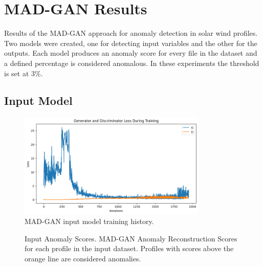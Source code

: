 \chapter{MAD-GAN Results}\label{apdx:madgan_res}
Results of the MAD-GAN approach for anomaly detection in solar wind profiles. Two models were created, one for detecting input variables and the other for the outputs. Each model produces an anomaly score for every file in the dataset and a defined percentage is considered anomalous. In these experiments the threshold is set at 3\%.

\section{Input Model}

\begin{figure}[h]
    \centering
    \includegraphics[width=0.8\textwidth]{figures/madga_train_hist_in.png}
    \caption{MAD-GAN input model training history.}
    \label{fig_a:madgan_in_hist}
\end{figure}

\begin{figure}
    \centering
    \caption[Input Anomaly Scores]{Input Anomaly Scores. MAD-GAN Anomaly Reconstruction Scores for each profile in the input dataset. Profiles with scores above the orange line are considered anomalies.}
\end{figure}

